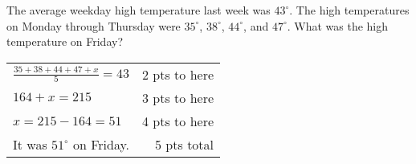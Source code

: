 

{
	The average weekday high temperature last week was $43^{\circ}$. The high temperatures on Monday through Thursday were $35^{\circ}$, $38^{\circ}$, $44^{\circ}$, and $47^{\circ}$. What was the high temperature on Friday?
}
{
	\begin{tabular}{l r}
	$\frac{35+38+44+47+x}{5}=43$ & 2 pts to here\\
	$164 +x=215$ & 3 pts to here\\
	$x=215-164=51$ & 4 pts to here\\
	It was $51^{\circ}$ on Friday. & 5 pts total
	\end{tabular}
}
